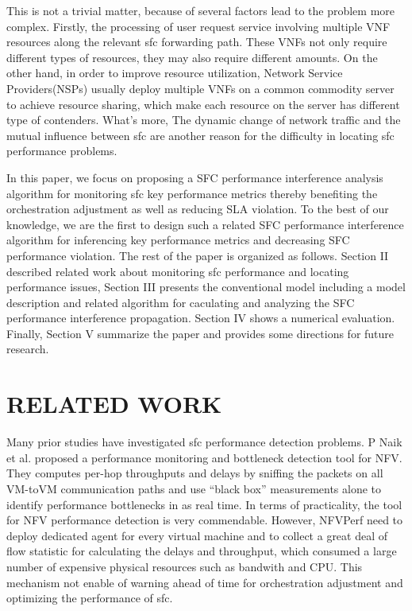 \documentclass{ieeeaccess}
\begin{document}
This is not a trivial matter, because of several factors lead to the problem more complex. Firstly, the processing of user request service involving multiple VNF resources along the relevant sfc forwarding path. These VNFs not only require different types of resources, they may also require different amounts. On the other hand, in order to improve resource utilization, Network Service Providers(NSPs) usually deploy multiple VNFs on a common commodity server to achieve resource sharing, which make each resource on the server has different type of contenders. What’s more, The dynamic change of network traffic and the mutual influence between sfc are another reason for the difficulty in locating sfc performance problems.

In this paper, we focus on proposing a SFC performance interference analysis algorithm for monitoring sfc key performance metrics thereby benefiting the orchestration adjustment as well as reducing SLA violation. To the best of our knowledge, we are the first to design such a related SFC performance interference algorithm for inferencing key performance metrics and decreasing SFC performance violation.
The rest of the paper is organized as follows. Section II described related work about monitoring sfc performance and locating performance issues, Section III presents the conventional model including a model description and related algorithm for caculating and analyzing the SFC performance interference propagation. Section IV shows a numerical evaluation. Finally, Section V summarize the paper and provides some directions for future research.

\section{RELATED WORK}
Many prior studies have investigated sfc performance detection problems.
P Naik et al.\cite{b19} proposed a performance monitoring and bottleneck detection tool for NFV. They computes per-hop throughputs and delays by sniffing the packets on all VM-toVM communication paths and use ``black box'' measurements alone to identify performance bottlenecks in as real time. In terms of practicality, the tool for NFV performance detection is very commendable. However, NFVPerf need to deploy dedicated agent for every virtual machine and to collect a great deal of flow statistic for calculating the delays and throughput, which consumed a large number of expensive physical resources such as bandwith and CPU. This mechanism not enable of warning ahead of time for orchestration adjustment and optimizing the performance of sfc.
\end{document}
